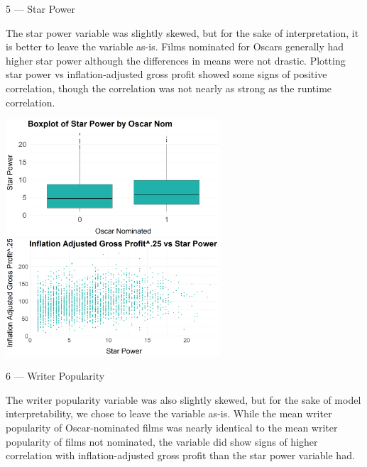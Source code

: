 \documentclass[10pt]{article}
\begin{document}


5 --- Star Power

The star power variable was slightly skewed, but for the sake of interpretation, it is better to leave the variable as-is. Films nominated for Oscars generally had higher star power although the differences in means were not drastic. Plotting star power vs inflation-adjusted gross profit showed some signs of positive correlation, though the correlation was not nearly as strong as the runtime correlation.

\begin{center}
\includegraphics[width=8cm]{_assets/_eda/star_power_on.png}
\hspace{1cm}
\includegraphics[width=8cm]{_assets/_eda/star_power_iagp.png}
\end{center}

6 --- Writer Popularity

The writer popularity variable was also slightly skewed, but for the sake of model interpretability, we chose to leave the variable as-is. While the mean writer popularity of Oscar-nominated films was nearly identical to the mean writer popularity of films not nominated, the variable did show signs of higher correlation with inflation-adjusted gross profit than the star power variable had. 
\end{document}
